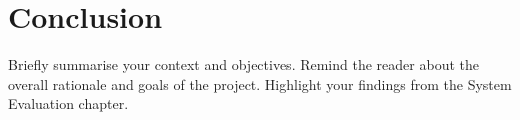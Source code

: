 \chapter{Conclusion}
Briefly summarise your context and objectives. Remind the reader about the overall rationale and goals of the project. 
Highlight your findings from the System Evaluation chapter.